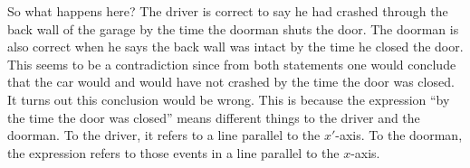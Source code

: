 \begin{solution}
So what happens here? The driver is correct to say he had crashed through the back wall of the garage by the time the doorman shuts the door. The doorman is also correct when he says the back wall was intact by the time he closed the door. This seems to be a contradiction since from both statements one would conclude that the car would and would have not crashed by the time the door was closed. It turns out this conclusion would be wrong. This is because the expression ``by the time the door was closed'' means different things to the driver and the doorman. To the driver, it refers to a line parallel to the $x'$-axis. To the doorman, the expression refers to those events in a line parallel to the $x$-axis.
\end{solution}